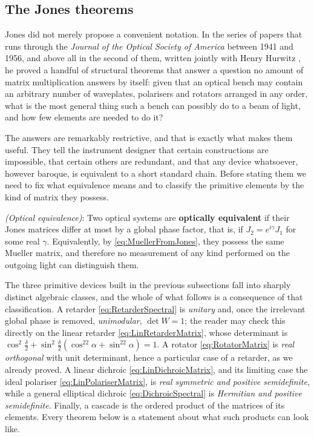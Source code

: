     \subsection{The Jones theorems}

        Jones did not merely propose a convenient notation. In the series of papers that runs through the \textit{Journal of the Optical Society of America} between 1941 and 1956, and above all in the second of them, written jointly with Henry Hurwitz \citep{hurwitz1941equivalence}, he proved a handful of structural theorems that answer a question no amount of matrix multiplication answers by itself: given that an optical bench may contain an arbitrary number of waveplates, polarisers and rotators arranged in any order, what is the most general thing such a bench can possibly do to a beam of light, and how few elements are needed to do it?

        The answers are remarkably restrictive, and that is exactly what makes them useful. They tell the instrument designer that certain constructions are impossible, that certain others are redundant, and that any device whatsoever, however baroque, is equivalent to a short standard chain. Before stating them we need to fix what equivalence means and to classify the primitive elements by the kind of matrix they possess.

        \begin{myDef}
            \textit{(Optical equivalence)}: Two optical systems are \textbf{optically equivalent} if their Jones matrices differ at most by a global phase factor, that is, if $J_2=e^{i\gamma}J_1$ for some real $\gamma$. Equivalently, by \ref{eq:MuellerFromJones}, they possess the same Mueller matrix, and therefore no measurement of any kind performed on the outgoing light can distinguish them.
        \end{myDef}

        The three primitive devices built in the previous subsections fall into sharply distinct algebraic classes, and the whole of what follows is a consequence of that classification. A retarder \ref{eq:RetarderSpectral} is \emph{unitary} and, once the irrelevant global phase is removed, \emph{unimodular}, $\det W=1$; the reader may check this directly on the linear retarder \ref{eq:LinRetarderMatrix}, whose determinant is $\cos^2\tfrac{\delta}{2}+\sin^2\tfrac{\delta}{2}\left(\cos^22\alpha+\sin^22\alpha\right)=1$. A rotator \ref{eq:RotatorMatrix} is \emph{real orthogonal} with unit determinant, hence a particular case of a retarder, as we already proved. A linear dichroic \ref{eq:LinDichroicMatrix}, and its limiting case the ideal polariser \ref{eq:LinPolariserMatrix}, is \emph{real symmetric and positive semidefinite}, while a general elliptical dichroic \ref{eq:DichroicSpectral} is \emph{Hermitian and positive semidefinite}. Finally, a cascade is the ordered product of the matrices of its elements. Every theorem below is a statement about what such products can look like.

